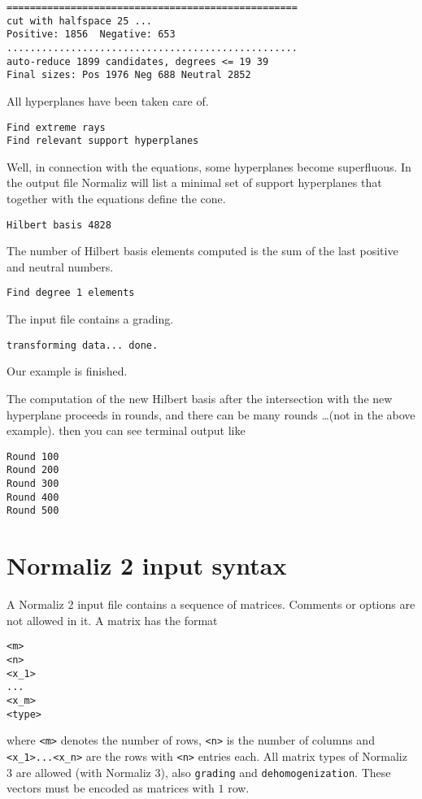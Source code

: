 \documentclass[12pt,a4paper]{scrartcl}
\theoremstyle{definition}
\begin{document}
\begin{Verbatim}
==================================================
cut with halfspace 25 ...
Positive: 1856  Negative: 653
..................................................
auto-reduce 1899 candidates, degrees <= 19 39 
Final sizes: Pos 1976 Neg 688 Neutral 2852
\end{Verbatim}
All hyperplanes have been taken care of.
\begin{Verbatim}
Find extreme rays
Find relevant support hyperplanes
\end{Verbatim}
Well, in connection with the equations, some hyperplanes become superfluous. In the output file Normaliz will list a minimal set of support hyperplanes that together with the equations define the cone.
\begin{Verbatim}
Hilbert basis 4828
\end{Verbatim}
The number of Hilbert basis elements computed is the sum of the last positive and neutral numbers.
\begin{Verbatim}
Find degree 1 elements
\end{Verbatim}
The input file contains a grading.
\begin{Verbatim}
transforming data... done.
\end{Verbatim}
Our example is finished.

The computation of the new Hilbert basis after the intersection with the new hyperplane proceeds in rounds, and there can be many rounds \dots (not in the above example). then you can see terminal output like
\begin{Verbatim}
Round 100
Round 200
Round 300
Round 400
Round 500
\end{Verbatim}

\section{Normaliz 2 input syntax}\label{OldSyntax}

A Normaliz 2 input file contains a sequence of matrices. Comments or options are not allowed in it. A matrix has the format
\begin{Verbatim}
<m>
<n>
<x_1>
...
<x_m>
<type>
\end{Verbatim}
where \verb|<m>| denotes the number of rows, \verb|<n>| is the number of columns and \verb|<x_1>...<x_n>| are the rows with \verb|<n>| entries each. All matrix types of Normaliz 3 are allowed (with Normaliz 3), also \verb|grading| and \verb|dehomogenization|. These vectors must be encoded as matrices with $1$ row.
\end{document}
